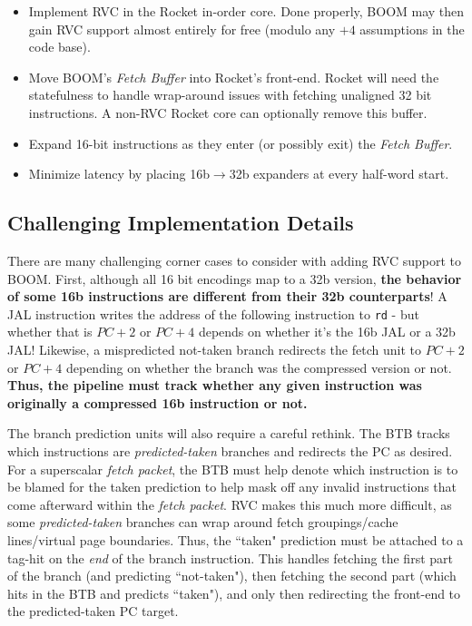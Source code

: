 \begin{itemize}
\item Implement RVC in the Rocket in-order core.  Done properly, BOOM may then gain RVC support almost entirely for free (modulo any $+4$ assumptions in the code base).
\item Move BOOM's {\em Fetch Buffer} into Rocket's front-end. Rocket will need the statefulness to handle wrap-around issues with fetching unaligned 32 bit instructions.  A non-RVC Rocket core can optionally remove this buffer. 
\item Expand 16-bit instructions as they enter (or possibly exit) the {\em Fetch Buffer}. 
\item Minimize latency by placing 16b$\rightarrow$32b expanders at every half-word start. 
\end{itemize}

\subsection{Challenging Implementation Details}

There are many challenging corner cases to consider with adding RVC support to BOOM. First, although all 16 bit encodings map to a 32b version, {\bf the behavior of some 16b instructions are different from their 32b counterparts}!  A JAL instruction writes the address of the following instruction to {\tt rd} - but whether that is $PC+2$ or $PC+4$ depends on whether it's the 16b JAL or a 32b JAL!  Likewise, a mispredicted not-taken branch redirects the fetch unit to $PC+2$ or $PC+4$ depending on whether the branch was the compressed version or not. {\bf Thus, the pipeline must track whether any given instruction was originally a compressed 16b instruction or not.}

The branch prediction units will also require a careful rethink. The BTB tracks which instructions are {\em predicted-taken} branches and redirects the PC as desired. For a superscalar {\em fetch packet}, the BTB must help denote which instruction is to be blamed for the taken prediction to help mask off any invalid instructions that come afterward within the {\em fetch packet}. RVC makes this much more difficult, as some {\em predicted-taken} branches can wrap around fetch groupings/cache lines/virtual page boundaries. Thus, the ``taken" prediction must be attached to a tag-hit on the {\em end} of the branch instruction.  This handles fetching the first part of the branch (and predicting ``not-taken"), then fetching the second part (which hits in the BTB and predicts ``taken"), and only then redirecting the front-end to the predicted-taken PC target. 

